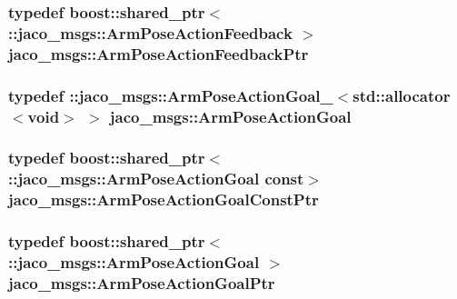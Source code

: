 \subsubsection[{\texorpdfstring{Arm\+Pose\+Action\+Feedback\+Ptr}{ArmPoseActionFeedbackPtr}}]{\setlength{\rightskip}{0pt plus 5cm}typedef boost\+::shared\+\_\+ptr$<$ \+::{\bf jaco\+\_\+msgs\+::\+Arm\+Pose\+Action\+Feedback} $>$ {\bf jaco\+\_\+msgs\+::\+Arm\+Pose\+Action\+Feedback\+Ptr}}\hypertarget{namespacejaco__msgs_ae614cc05e0e370e568aa40d6ffd15ea5}{}\label{namespacejaco__msgs_ae614cc05e0e370e568aa40d6ffd15ea5}
\subsubsection[{\texorpdfstring{Arm\+Pose\+Action\+Goal}{ArmPoseActionGoal}}]{\setlength{\rightskip}{0pt plus 5cm}typedef \+::{\bf jaco\+\_\+msgs\+::\+Arm\+Pose\+Action\+Goal\+\_\+}$<$std\+::allocator$<$void$>$ $>$ {\bf jaco\+\_\+msgs\+::\+Arm\+Pose\+Action\+Goal}}\hypertarget{namespacejaco__msgs_a2e83673c25190ff8e4624e814c90a135}{}\label{namespacejaco__msgs_a2e83673c25190ff8e4624e814c90a135}
\subsubsection[{\texorpdfstring{Arm\+Pose\+Action\+Goal\+Const\+Ptr}{ArmPoseActionGoalConstPtr}}]{\setlength{\rightskip}{0pt plus 5cm}typedef boost\+::shared\+\_\+ptr$<$ \+::{\bf jaco\+\_\+msgs\+::\+Arm\+Pose\+Action\+Goal} const$>$ {\bf jaco\+\_\+msgs\+::\+Arm\+Pose\+Action\+Goal\+Const\+Ptr}}\hypertarget{namespacejaco__msgs_ad6166efbd8bc4701e9a4b7a5d9722ec3}{}\label{namespacejaco__msgs_ad6166efbd8bc4701e9a4b7a5d9722ec3}
\subsubsection[{\texorpdfstring{Arm\+Pose\+Action\+Goal\+Ptr}{ArmPoseActionGoalPtr}}]{\setlength{\rightskip}{0pt plus 5cm}typedef boost\+::shared\+\_\+ptr$<$ \+::{\bf jaco\+\_\+msgs\+::\+Arm\+Pose\+Action\+Goal} $>$ {\bf jaco\+\_\+msgs\+::\+Arm\+Pose\+Action\+Goal\+Ptr}}\hypertarget{namespacejaco__msgs_a4996cfc2f9b8b8d6c276363b8c735675}{}\label{namespacejaco__msgs_a4996cfc2f9b8b8d6c276363b8c735675}
